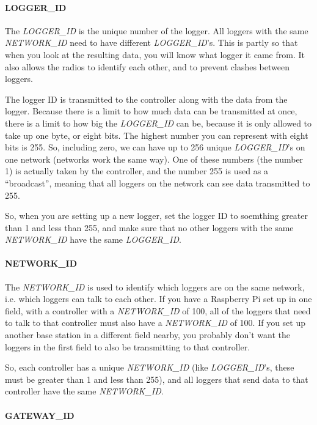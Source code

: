 \documentclass[10pt]{article}
\begin{document}
\paragraph{LOGGER\_ID}
The \textit{LOGGER\_ID} is the unique number of the logger. All loggers with the same \textit{NETWORK\_ID} need to have different \textit{LOGGER\_ID}'s. This is partly so 
that when you look at the resulting data, you will know what logger it came from. It also allows the radios to identify each other, and to prevent clashes between 
loggers. \break

The logger ID is transmitted to the controller along with the data from the logger. Because there is a limit to how much data can be transmitted at once, there is a limit
to how big the \textit{LOGGER\_ID} can be, because it is only allowed to take up one byte, or eight bits. The highest number you can represent with eight bits is 255. So,
including zero, we can have up to 256 unique \textit{LOGGER\_ID}'s on one network (networks work the same way). One of these numbers (the number 1) is actually taken by
the controller, and the number 255 is used as a ``broadcast'', meaning that all loggers on the network can see data transmitted to 255. \break

So, when you are setting up a new logger, set the logger ID to soemthing greater than 1 and less than 255, and make sure that no other loggers with the same 
\textit{NETWORK\_ID} have the same \textit{LOGGER\_ID}. 

\paragraph{NETWORK\_ID}
The \textit{NETWORK\_ID} is used to identify which loggers are on the same network, i.e. which loggers can talk to each other. If you have a Raspberry Pi set up in one
field, with a controller with a \textit{NETWORK\_ID} of 100, all of the loggers that need to talk to that controller must also have a \textit{NETWORK\_ID} of 100. If you 
set up another base station in a different field nearby, you probably don't want the loggers in the first field to also be transmitting to that controller.

So, each controller has a unique \textit{NETWORK\_ID} (like \textit{LOGGER\_ID}'s, these must be greater than 1 and less than 255), and all loggers that send data to
that controller have the same \textit{NETWORK\_ID}.

\paragraph{GATEWAY\_ID}
\end{document}
